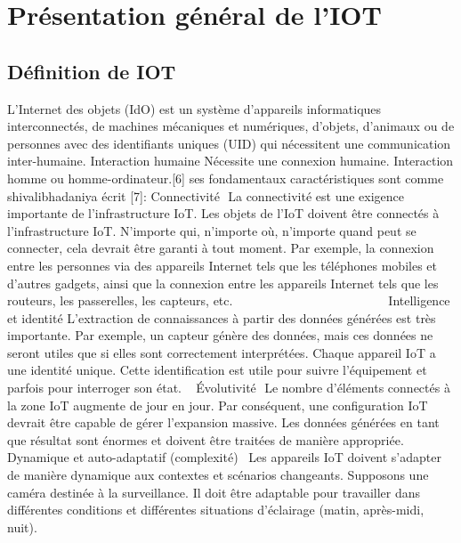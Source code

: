 \chapter{Présentation général de l’IOT} \label{chap:Présentation général de l’IOT}
\section{Définition de IOT}
L'Internet des objets (IdO) est un système d'appareils informatiques interconnectés, de machines mécaniques et numériques, d'objets, d'animaux ou de personnes avec des identifiants uniques (UID) qui nécessitent une communication inter-humaine. Interaction humaine Nécessite une connexion humaine. Interaction homme ou homme-ordinateur.[6] ses fondamentaux caractéristiques sont comme shivalibhadaniya écrit  [7]: \newline
Connectivité \newline La connectivité est une exigence importante de l’infrastructure IoT. Les objets de l’IoT doivent être connectés à l’infrastructure IoT. N’importe qui, n’importe où, n’importe quand peut se connecter, cela devrait être garanti à tout moment. Par exemple, la connexion entre les personnes via des appareils Internet tels que les téléphones mobiles et d’autres gadgets, ainsi que la connexion entre les appareils Internet tels que les routeurs, les passerelles, les capteurs, etc.  \newline                            
Intelligence et identité \newline
L’extraction de connaissances à partir des données générées est très importante. Par exemple, un capteur génère des données, mais ces données ne seront utiles que si elles sont correctement interprétées. Chaque appareil IoT a une identité unique. Cette identification est utile pour suivre l’équipement et parfois pour interroger son état.\newline  
Évolutivité \newline Le nombre d’éléments connectés à la zone IoT augmente de jour en jour. Par conséquent, une configuration IoT devrait être capable de gérer l’expansion massive. Les données générées en tant que résultat sont énormes et doivent être traitées de manière appropriée.\newline  
Dynamique et auto-adaptatif (complexité) \newline
 Les appareils IoT doivent s’adapter de manière dynamique aux contextes et scénarios changeants. Supposons une caméra destinée à la surveillance. Il doit être adaptable pour travailler dans différentes conditions et différentes situations d’éclairage (matin, après-midi, nuit).\newline  
